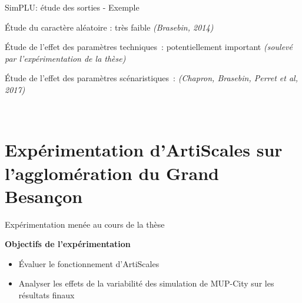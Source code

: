 \documentclass[xcolor=table]{beamer}
\newcommand\FontPetit{\fontsize{8}{6}\selectfont}
\begin{document}
\begin{frame}{SimPLU: étude des sorties - Exemple}
	\begin{block}{}
		Étude du caractère aléatoire : très faible \textit{(Brasebin, 2014)}
	\end{block}
	\begin{block}{}
		Étude de l'effet des paramètres techniques~: potentiellement important \textit{(soulevé par l'expérimentation de la thèse)}
	\end{block}
	\begin{block}{}
		Étude de l'effet des paramètres scénaristiques~: \textit{(Chapron, Brasebin, Perret et al, 2017)}
		
\end{block}
	\\
	\FontPetit\centering{\textit{ }}
\end{frame}




\section[Expérimentation]{Expérimentation d'ArtiScales sur l'agglomération du Grand Besançon}




\begin{frame}{Expérimentation menée au cours de la thèse}
	\begin{block}
		\textbf{Objectifs de l'expérimentation}\\
		\begin{itemize}
			\item Évaluer le fonctionnement d'ArtiScales
			\item Analyser les effets de la variabilité des simulation de MUP-City sur les résultats finaux 
		\end{itemize}
	\end{block}
\end{frame}
\end{document}
